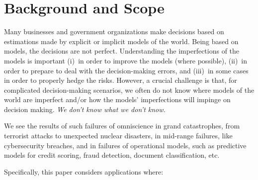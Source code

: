 \section{Background and Scope}

Many businesses and government organizations make decisions based on
estimations made by explicit or implicit models of the world.  Being
based on models, the decisions are not perfect.  Understanding the
imperfections of the models is important (i)~in order to improve the
models (where possible), (ii)~in order to prepare to deal with the
decision-making errors, and (iii)~in some cases in order to properly
hedge the risks.  However, a crucial challenge is that, for 
complicated decision-making scenarios, we often do not know where 
models of the world are imperfect and/or how the models' imperfections
will impinge on decision making. \emph{ We don't know what we don't know.}

We see the results of such failures of omniscience in grand
catastrophes, from terrorist attacks to unexpected nuclear disasters,
in mid-range failures, like cybersecurity breaches, and in failures of
operational models, such as predictive models for credit scoring,
fraud detection, document classification, etc.


Specifically, this paper considers applications where:

